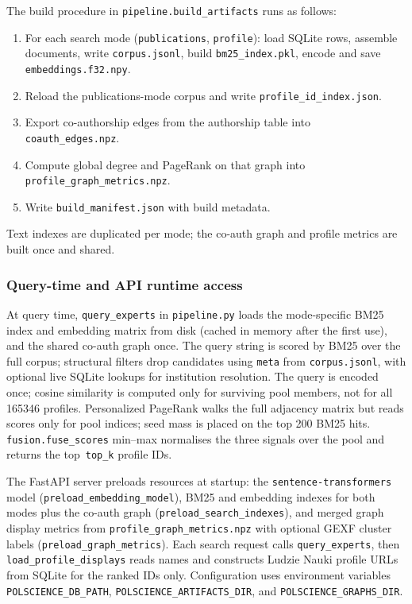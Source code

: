 \documentclass{article}
\begin{document}
The build procedure in \texttt{pipeline.build\_artifacts} runs as follows:
\begin{enumerate}[noitemsep]
  \item For each search mode (\texttt{publications}, \texttt{profile}): load SQLite rows, assemble documents, write \texttt{corpus.jsonl}, build \texttt{bm25\_index.pkl}, encode and save \texttt{embeddings.f32.npy}.
  \item Reload the publications-mode corpus and write \texttt{profile\_id\_index.json}.
  \item Export co-authorship edges from the authorship table into \texttt{coauth\_edges.npz}.
  \item Compute global degree and PageRank on that graph into \texttt{profile\_graph\_metrics.npz}.
  \item Write \texttt{build\_manifest.json} with build metadata.
\end{enumerate}
Text indexes are duplicated per mode; the co-auth graph and profile metrics are built once and shared.

\subsubsection{Query-time and API runtime access}

At query time, \texttt{query\_experts} in \texttt{pipeline.py} loads the mode-specific BM25 index and embedding matrix from disk (cached in memory after the first use), and the shared co-auth graph once. The query string is scored by BM25 over the full corpus; structural filters drop candidates using \texttt{meta} from \texttt{corpus.jsonl}, with optional live SQLite lookups for institution resolution. The query is encoded once; cosine similarity is computed only for surviving pool members, not for all \num{165346} profiles. Personalized PageRank walks the full adjacency matrix but reads scores only for pool indices; seed mass is placed on the top \num{200} BM25 hits. \texttt{fusion.fuse\_scores} min--max normalises the three signals over the pool and returns the top~\texttt{top\_k} profile IDs.

The FastAPI server preloads resources at startup: the \texttt{sentence-transformers} model (\texttt{preload\_embedding\_model}), BM25 and embedding indexes for both modes plus the co-auth graph (\texttt{preload\_search\_indexes}), and merged graph display metrics from \texttt{profile\_graph\_metrics.npz} with optional GEXF cluster labels (\texttt{preload\_graph\_metrics}). Each search request calls \texttt{query\_experts}, then \texttt{load\_profile\_displays} reads names and constructs Ludzie Nauki profile URLs from SQLite for the ranked IDs only. Configuration uses environment variables \texttt{POLSCIENCE\_DB\_PATH}, \texttt{POLSCIENCE\_ARTIFACTS\_DIR}, and \texttt{POLSCIENCE\_GRAPHS\_DIR}.
\end{document}
